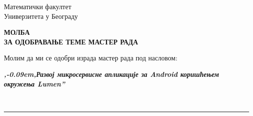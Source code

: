 \documentclass[a4paper]{article}
\def\zn{,\kern-0.09em,}
\begin{document}
\thispagestyle{empty}

\begin{flushleft}
Математички факултет\\
Универзитета у Београду
\end{flushleft}

\bigskip

\begin{center}
\textbf{МОЛБА\\
ЗА ОДОБРАВАЊЕ ТЕМЕ МАСТЕР РАДА
}\end{center}

\bigskip

\begin{flushleft}
Молим да ми се одобри израда мастер рада под насловом:
\end{flushleft}

\begin{minipage}{16.5cm}
\textbf{\textit{\zn Развој микросервисне апликације за Android коришћењем окружења Lumen''}}
\end{minipage}\\
\rule[4mm]{17.5cm}{.05mm}
\end{document}
